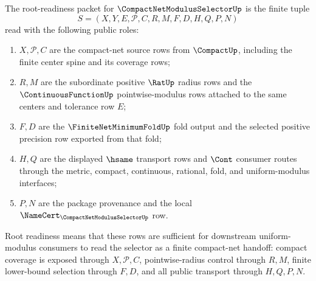 \begin{definition}
\label{def:compact-net-modulus-selector-root-readiness}
The root-readiness packet for $\CompactNetModulusSelectorUp$ is the finite tuple
$$
S=(X,Y,E,\mathcal{P},C,R,M,F,D,H,Q,P,N)
$$
read with the following public roles:
\begin{enumerate}
\item $X,\mathcal{P},C$ are the compact-net source rows from $\CompactUp$, including the finite center spine and its coverage rows;
\item $R,M$ are the subordinate positive $\RatUp$ radius rows and the $\ContinuousFunctionUp$ pointwise-modulus rows attached to the same centers and tolerance row $E$;
\item $F,D$ are the $\FiniteNetMinimumFoldUp$ fold output and the selected positive precision row exported from that fold;
\item $H,Q$ are the displayed $\hsame$ transport rows and $\Cont$ consumer routes through the metric, compact, continuous, rational, fold, and uniform-modulus interfaces;
\item $P,N$ are the package provenance and the local $\NameCert_{\CompactNetModulusSelectorUp}$ row.
\end{enumerate}
Root readiness means that these rows are sufficient for downstream uniform-modulus consumers to read the selector as a finite compact-net handoff: compact coverage is exposed through $X,\mathcal{P},C$, pointwise-radius control through $R,M$, finite lower-bound selection through $F,D$, and all public transport through $H,Q,P,N$.
\end{definition}

